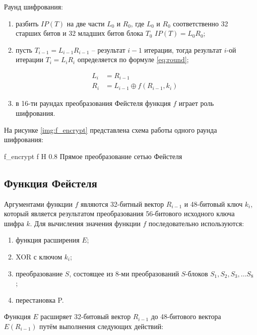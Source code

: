 Раунд шифрования:

\begin{enumerate}
	\item разбить $IP(T)$ на две части $L_0$ и $R_0$, где $L_0$ и $R_0$ соответственно 32 старших битов и 32 младших битов блока $T_0$ $IP(T) = L_0 R_0$;
	\item пусть $T_{i-1} = L_{i-1}R_{i-1}$ -- результат $i-1$ итерации, тогда результат $i$-ой  итерации $T_{i} = L_{i}R_{i}$ определяется по формуле \ref{eq:round};
	
	\begin{equation}
		\label{eq:round}
		\begin{aligned}
			L_i &= R_{i-1} \\
			R_i &= L_{i-1} \oplus f(R_{i-1}, k_i)
		\end{aligned}
	\end{equation}
	\item в 16-ти раундах преобразования Фейстеля функция $f$ играет роль шифрования.
\end{enumerate}

На рисунке \ref{img:f_encrypt} представлена схема работы одного раунда шифрования:

{f_encrypt} %
{f} %
{H} %
{0.8\textwidth} %
{Прямое преобразование сетью Фейстеля} %

\subsection{Функция Фейстеля}

Аргументами функции $f$ являются 32-битный вектор $R_{i-1}$ и 48-битовый ключ $k_i$, который является результатом преобразования 56-битового исходного ключа шифра $k$. Для вычисления значения  функции $f$ последовательно используются: 

\begin{enumerate}
	\item функция расширения $E$;
	\item XOR с ключом $k_i$;
	\item преобразование $S$, состоящее из 8-ми преобразований $S$-блоков $S_1, S_2, S_3, \ldots S_8$;
	\item перестановка P.
\end{enumerate}

Функция $E$ расширяет 32-битовый вектор $R_{i-1}$ до 48-битового вектора $E(R_{i-1})$ путём выполнения следующих действий:

